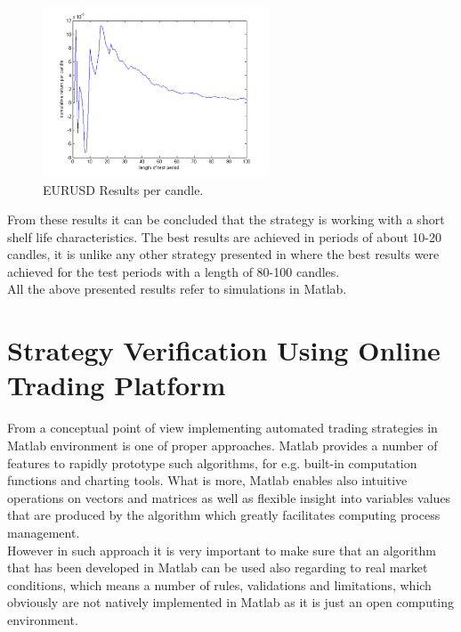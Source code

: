 \documentclass[runningheads,a4paper]{llncs}
\begin{document}
\begin{figure}[h!]
\centering
\includegraphics[width = 0.6\textwidth]{figures/rys10.png}
\caption{EURUSD Results per candle.}
\label{fig:fig10}
\end{figure}
\FloatBarrier
\vspace{-1em}

From these results it can be concluded that the strategy is working with a short shelf life characteristics. The best results are achieved in periods of about 10-20 candles, it is unlike any other strategy presented in \cite{Wilinski2014} where the best results were achieved for the test periods with a length of 80-100 candles.\\
All the above presented results refer to simulations in Matlab.

\section{Strategy Verification Using Online Trading Platform}
From a conceptual point of view implementing automated trading strategies in Matlab environment is one of proper approaches. Matlab provides a number of features to rapidly prototype such algorithms, for e.g. built-in computation functions and charting tools. What is more, Matlab enables also intuitive operations on vectors and matrices as well as flexible insight into variables values that are produced by the algorithm which greatly facilitates computing process management.\\

However in such approach it is very important to make sure that an algorithm that has been developed in Matlab can be used also regarding to real market conditions, which means a number of rules, validations and limitations, which obviously are not natively implemented in Matlab as it is just an open computing environment.\\
\end{document}
